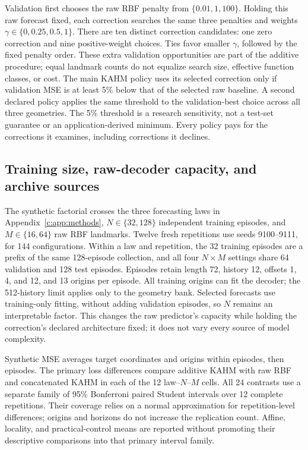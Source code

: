 Validation first chooses the raw RBF penalty from
$\{0.01,1,100\}$. Holding this raw forecast fixed, each correction searches
the same three penalties and weights $\gamma\in\{0,0.25,0.5,1\}$.
There are ten distinct correction candidates: one zero correction and
nine positive-weight choices. Ties favor smaller $\gamma$, followed by
the fixed penalty order. These extra validation opportunities are part
of the additive procedure; equal landmark counts do not equalize search
size, effective function classes, or cost. The main KAHM policy uses its
selected correction only if validation MSE is at least 5\% below that of
the selected raw baseline. A second declared policy applies the same
threshold to the validation-best choice across all three geometries.
The 5\% threshold is a research sensitivity, not a test-set guarantee or
an application-derived minimum. Every policy pays for the corrections
it examines, including corrections it declines.

\subsection{Training size, raw-decoder capacity, and archive sources}
\label{sec:utility-design}

The synthetic factorial crosses the three forecasting laws in
Appendix~\ref{c:app:methods},
$N\in\{32,128\}$ independent training episodes, and
$M\in\{16,64\}$ raw RBF landmarks. Twelve fresh repetitions use seeds
9100--9111, for 144 configurations. Within a law and repetition, the 32
training episodes are a prefix of the same 128-episode collection, and
all four $N\times M$ settings share 64 validation and 128 test episodes.
Episodes retain length 72, history 12, offsets 1, 4, and 12, and 13 origins
per episode. All training origins can fit the decoder; the 512-history
limit applies only to the geometry bank. Selected forecasts use
training-only fitting, without adding validation episodes, so $N$ remains
an interpretable factor. This changes the raw predictor's capacity while
holding the correction's declared architecture fixed; it does not vary
every source of model complexity.

Synthetic MSE averages target coordinates and origins within episodes,
then episodes. The primary loss differences compare additive KAHM with
raw RBF and concatenated KAHM in each of the 12 law--$N$--$M$ cells.
All 24 contrasts use a separate family of 95\% Bonferroni paired Student
intervals over 12 complete repetitions. Their coverage relies on a
normal approximation for repetition-level differences; origins and
horizons do not increase the replication count. Affine, locality, and
practical-control means are reported without promoting their descriptive
comparisons into that primary interval family.

